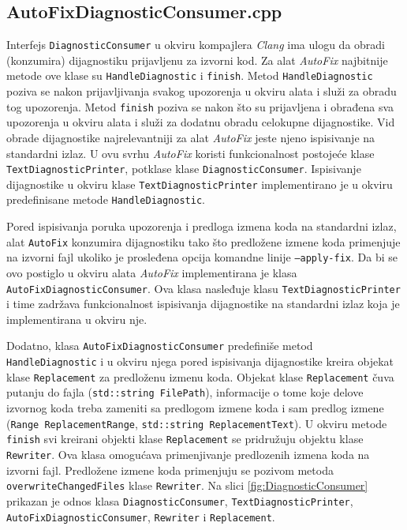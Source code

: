 \documentclass[12pt,oneside]{memoir}
\begin{document}
\subsection{AutoFixDiagnosticConsumer.cpp}
Interfejs \texttt{DiagnosticConsumer} u okviru kompajlera \textit{Clang} ima ulogu da obradi (konzumira) dijagnostiku prijavljenu
za izvorni kod. Za alat \textit{AutoFix} najbitnije metode ove klase su \texttt{HandleDiagnostic} i \texttt{finish}. Metod \texttt{HandleDiagnostic} poziva se nakon prijavljivanja svakog upozorenja u okviru alata i slu\v{z}i za obradu tog upozorenja. Metod \texttt{finish} poziva se nakon \v{s}to su prijavljena i obrađena sva upozorenja u okviru alata i slu\v{z}i za dodatnu obradu celokupne dijagnostike. Vid obrade dijagnostike najrelevantniji za alat \textit{AutoFix} jeste njeno ispisivanje na standardni izlaz. U ovu 
svrhu \textit{AutoFix} koristi funkcionalnost postoje\'{c}e klase \texttt{TextDiagnosticPrinter}, potklase klase \texttt{DiagnosticConsumer}. Ispisivanje dijagnostike u okviru klase \texttt{TextDiagnosticPrinter} implementirano je u okviru predefinisane metode \texttt{HandleDiagnostic}. \par
Pored ispisivanja poruka upozorenja i predloga izmena koda na standardni izlaz, alat \texttt{AutoFix} konzumira dijagnostiku tako \v{s}to predlo\v{z}ene izmene koda primenjuje na izvorni fajl ukoliko je prosleđena opcija komandne linije \texttt{--apply-fix}.
Da bi se ovo postiglo u okviru alata \textit{AutoFix} implementirana je klasa \texttt{AutoFix\-DiagnosticConsumer}. Ova klasa nasleđuje
klasu \texttt{TextDiagnosticPrinter} i time zadr\v{z}ava funkcionalnost ispisivanja dijagnostike na standardni izlaz koja je implementirana u okviru nje. \par Dodatno, klasa \texttt{AutoFixDiagnosticConsumer} predefini\v{s}e metod \texttt{HandleDiag\-nostic} i u okviru njega pored ispisivanja dijagnostike kreira objekat klase \texttt{Replace\-ment} za predlo\v{z}enu izmenu koda. Objekat klase \texttt{Replacement} \v{c}uva putanju do fajla (\texttt{std::string FilePath}), informacije o tome koje delove izvornog koda treba zameniti sa predlogom izmene koda i sam predlog izmene (\texttt{Range ReplacementRange}, \texttt{std::string ReplacementText}).
U okviru metode \texttt{finish} svi kreirani objekti klase \texttt{Replacement} se pridru\v{z}uju objektu klase \texttt{Rewriter}.
Ova klasa omogu\'{c}ava primenjivanje predlozenih izmena koda na izvorni fajl. Predlo\v{z}ene izmene koda primenjuju se pozivom metoda \texttt{overwriteChangedFiles} klase \texttt{Rewriter}. Na slici \ref{fig:DiagnosticConsumer} prikazan je odnos klasa \texttt{DiagnosticConsumer}, \texttt{TextDiagnosticPrinter}, \texttt{AutoFixDiagnosticConsumer}, \texttt{Rewriter} i \texttt{Replacement}.
\end{document}
